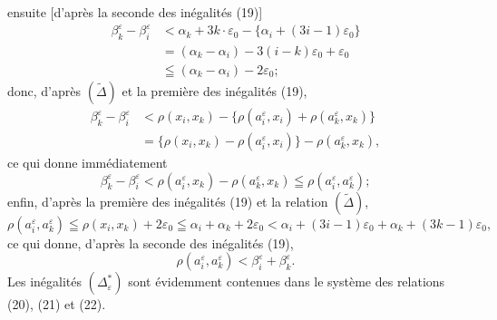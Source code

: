 \documentclass[a4paper,12pt]{amsart}
\newcommand{\srcpage}[1]{} %
\begin{document}
\srcpage{60}
ensuite [d'après la seconde des inégalités (19)]
\[
\begin{aligned}
\beta_k^\varepsilon-\beta_i^\varepsilon
&<\alpha_k+3k\cdot\varepsilon_0-\{\alpha_i+(3i-1)\varepsilon_0\}\\
&=(\alpha_k-\alpha_i)-3(i-k)\varepsilon_0+\varepsilon_0\\
&\leqq(\alpha_k-\alpha_i)-2\varepsilon_0;
\end{aligned}
\]
donc, d'après $(\widetilde{\Delta})$ et la première des inégalités (19),
\[
\begin{aligned}
\beta_k^\varepsilon-\beta_i^\varepsilon
&<\rho(x_i,x_k)-\{\rho(a_i^\varepsilon,x_i)+\rho(a_k^\varepsilon,x_k)\}\\
&=\{\rho(x_i,x_k)-\rho(a_i^\varepsilon,x_i)\}-\rho(a_k^\varepsilon,x_k),
\end{aligned}
\]
ce qui donne immédiatement
\begin{equation}\tag{21}
\beta_k^\varepsilon-\beta_i^\varepsilon
<\rho(a_i^\varepsilon,x_k)-\rho(a_k^\varepsilon,x_k)
\leqq\rho(a_i^\varepsilon,a_k^\varepsilon);
\end{equation}
enfin, d'après la première des inégalités (19) et la relation $(\widetilde{\Delta})$,
{\small
\[
\rho(a_i^\varepsilon,a_k^\varepsilon)\leqq\rho(x_i,x_k)+2\varepsilon_0
\leqq\alpha_i+\alpha_k+2\varepsilon_0
<\alpha_i+(3i-1)\varepsilon_0+\alpha_k+(3k-1)\varepsilon_0,
\]
}
ce qui donne, d'après la seconde des inégalités (19),
\begin{equation}\tag{22}
\rho(a_i^\varepsilon,a_k^\varepsilon)<\beta_i^\varepsilon+\beta_k^\varepsilon.
\end{equation}
Les inégalités $(\Delta^*_\varepsilon)$ sont évidemment contenues dans le système des relations (20), (21) et (22).
\end{document}
